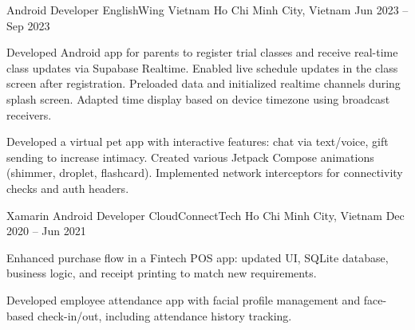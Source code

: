 \begin{cventries}
    \cventry
    {Android Developer}
    {EnglishWing Vietnam}
    {Ho Chi Minh City, Vietnam}
    {Jun 2023 -- Sep 2023}
    {
        \begin{cvitems}
            \item {
                Developed Android app for parents to register trial classes and receive real-time class updates via Supabase Realtime.
                Enabled live schedule updates in the class screen after registration.
                Preloaded data and initialized realtime channels during splash screen.
                Adapted time display based on device timezone using broadcast receivers.
            }
            \item {
                Developed a virtual pet app with interactive features: chat via text/voice, gift sending to increase intimacy.
                Created various Jetpack Compose animations (shimmer, droplet, flashcard).
                Implemented network interceptors for connectivity checks and auth headers.
            }
        \end{cvitems}
    }

    \cventry
    {Xamarin Android Developer}
    {CloudConnectTech}
    {Ho Chi Minh City, Vietnam}
    {Dec 2020 -- Jun 2021}
    {
        \begin{cvitems}
            \item {
                Enhanced purchase flow in a Fintech POS app: updated UI, SQLite database, business logic, and receipt printing to match new requirements.
            }
            \item {
                Developed employee attendance app with facial profile management and face-based check-in/out, including attendance history tracking.
            }
        \end{cvitems}
    }
\end{cventries}
